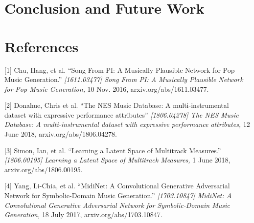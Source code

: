 \documentclass{article}
\begin{document}



\section{Conclusion and Future Work}




\section*{References}


\small

[1] Chu, Hang, et al. ``Song From PI: A Musically Plausible Network for Pop Music Generation.'' {\it [1611.03477] Song From PI: A Musically Plausible Network for Pop Music Generation,} 10 Nov. 2016, arxiv.org/abs/1611.03477.

[2] Donahue, Chris et al. ``The NES Music Database: A multi-instrumental dataset with expressive performance attributes'' {\it [1806.04278] The NES Music Database: A multi-instrumental dataset with expressive performance attributes,} 12 June 2018, arxiv.org/abs/1806.04278.

[3] Simon, Ian, et al. ``Learning a Latent Space of Multitrack Measures.'' {\it[1806.00195] Learning a Latent Space of Multitrack Measures,} 1 June 2018, arxiv.org/abs/1806.00195.

[4] Yang, Li-Chia, et al. ``MidiNet: A Convolutional Generative Adversarial Network for Symbolic-Domain Music Generation.'' {\it[1703.10847] MidiNet: A Convolutional Generative Adversarial Network for Symbolic-Domain Music Generation,} 18 July 2017, arxiv.org/abs/1703.10847.
\end{document}
